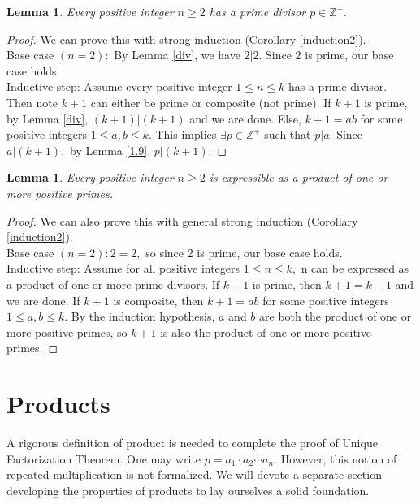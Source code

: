 \documentclass{article}
\newcommand{\Z}{\mathbb{Z}}
\newtheorem{lem}[thm]{Lemma}
\begin{document}
\begin{lem}
\label{3.8} Every positive integer $n\geq2$ has a prime divisor $p\in \Z^{+}.$
\end{lem}
\begin{proof}
We can prove this with strong induction (Corollary \ref{induction2}). \\

Base case $(n=2):$ By Lemma \ref{div}, we have $2|2.$ Since $2$ is prime, our base case holds. \\

Inductive step: Assume every positive integer $1\leq n\leq k$ has a prime divisor. Then note $k+1$ can either be prime or composite (not prime). If $k+1$ is prime, by Lemma \ref{div}, $(k+1)|(k+1)$ and we are done. Else, $k+1 = ab$ for some positive integers $1\leq a,b \leq k.$ This implies $\exists p\in \Z^{+}$ such that $p|a.$ Since $a|(k+1),$ by Lemma \ref{1.9}, $p|(k+1).$
\end{proof}

\begin{lem}
\label{3.9}Every positive integer $n\geq2$ is expressible as a product of one or more positive primes.
\end{lem}
\begin{proof}
We can also prove this with general strong induction (Corollary \ref{induction2}). \\

Base case $(n=2): 2=2,$ so since 2 is prime, our base case holds. \\

Inductive step: Assume for all positive integers $1\leq n \leq k,$ n can be expressed as a product of one or more prime divisors. If $k+1$ is prime, then $k+1=k+1$ and we are done. If $k+1$ is composite, then $k+1=ab$ for some positive integers $1\leq a,b \leq k.$ By the induction hypothesis, $a$ and $b$ are both the product of one or more positive primes, so $k+1$ is also the product of one or more positive primes.
\end{proof}








\section{Products}
A rigorous definition of product is needed to complete the proof of Unique Factorization Theorem. One may write $p= a_1 \cdot a_2 \cdots a_n$. However, this notion of repeated multiplication is not formalized. We will devote a separate section developing the properties of products to lay ourselves a solid foundation.
\end{document}
